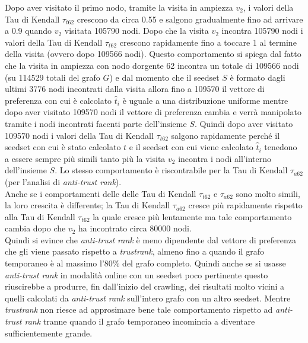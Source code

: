 Dopo aver visitato il primo nodo, tramite la visita in ampiezza \(v_2\), i valori della Tau di Kendall \(\tau_{t62}\) crescono da circa 0.55  e salgono gradualmente fino ad arrivare a 0.9 quando \(v_2\) visitata 105790 nodi. Dopo che  la visita \(v_2\) incontra 105790 nodi i valori della Tau di Kendall \(\tau_{t62}\) crescono rapidamente fino a toccare 1 al termine della visita (ovvero dopo 109566 nodi). Questo comportamento si spiega dal fatto che la visita in ampiezza con nodo dorgente 62 incontra un totale di 109566 nodi (su 114529 totali del grafo \(G\)) e dal momento che il seedset \(S\) è formato dagli ultimi 3776 nodi incontrati dalla visita allora fino a 109570 il vettore di preferenza con cui è calcolato \(\hat{t}_i\) è uguale a una distribuzione uniforme mentre dopo aver visitato 109570 nodi il vettore di preferenza cambia e verrà manipolato tramite i nodi incontrati facenti parte dell'insieme \(S\). Quindi dopo aver visitato 109570 nodi i valori della Tau di Kendall \(\tau_{t62}\) salgono rapidamente perché il seedset con cui è stato calcolato \(t\) e il seedset con cui viene calcolato \(\hat{t}_i\) tenedono a essere sempre più simili tanto più la visita \(v_2\) incontra i nodi all'interno dell'insieme \(S\). Lo stesso comportamento è riscontrabile per la Tau di Kendall \(\tau_{a62}\) (per l'analisi di \textit{anti-trust rank}).\\ 
Anche se i comportamenti delle delle Tau di Kendall \(\tau_{t62}\) e \(\tau_{a62}\) sono molto simili, la loro crescita è differente; la Tau di Kendall \(\tau_{a62}\) cresce più rapidamente rispetto alla Tau di Kendall \(\tau_{t62}\) la quale cresce più lentamente ma tale comportamento cambia dopo che \(v_2\) ha incontrato circa 80000 nodi.\\
Quindi si evince che \textit{anti-trust rank} è meno dipendente dal vettore di preferenza che gli viene passato rispetto a \textit{trustrank}, almeno fino a quando il grafo temporaneo è al massimo l'80\% del grafo completo. Quindi anche se si usasse \textit{anti-trust rank} in modalità online con un seedset poco pertinente questo riuscirebbe a produrre, fin dall'inizio del crawling, dei risultati molto vicini a quelli calcolati da \textit{anti-trust rank} sull'intero grafo con un altro seedset. Mentre \textit{trustrank} non riesce ad approsimare bene tale comportamento rispetto ad \textit{anti-trust rank} tranne quando il  grafo temporaneo incomincia a diventare sufficientemente grande.

